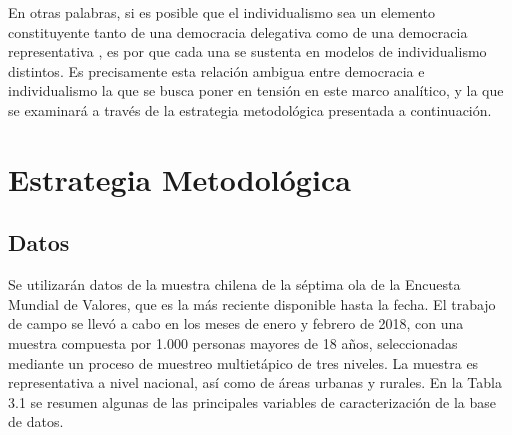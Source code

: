 \documentclass[12pt,twoside]{templates/facsothesis}
\begin{document}
En otras palabras, si es posible que el individualismo sea un elemento constituyente tanto de una democracia delegativa \citep{odonnell1994} como de una democracia representativa \citep{martuccelli2010}, es por que cada una se sustenta en modelos de individualismo distintos. Es precisamente esta relación ambigua entre democracia e individualismo la que se busca poner en tensión en este marco analítico, y la que se examinará a través de la estrategia metodológica presentada a continuación.

\hypertarget{estrategia-metodoluxf3gica}{%
\chapter{Estrategia Metodológica}\label{estrategia-metodoluxf3gica}}

\hypertarget{datos}{%
\section{Datos}\label{datos}}

Se utilizarán datos de la muestra chilena de la séptima ola de la Encuesta Mundial de Valores, que es la más reciente disponible hasta la fecha. El trabajo de campo se llevó a cabo en los meses de enero y febrero de 2018, con una muestra compuesta por 1.000 personas mayores de 18 años, seleccionadas mediante un proceso de muestreo multietápico de tres niveles. La muestra es representativa a nivel nacional, así como de áreas urbanas y rurales. En la Tabla 3.1 se resumen algunas de las principales variables de caracterización de la base de datos.
\end{document}
